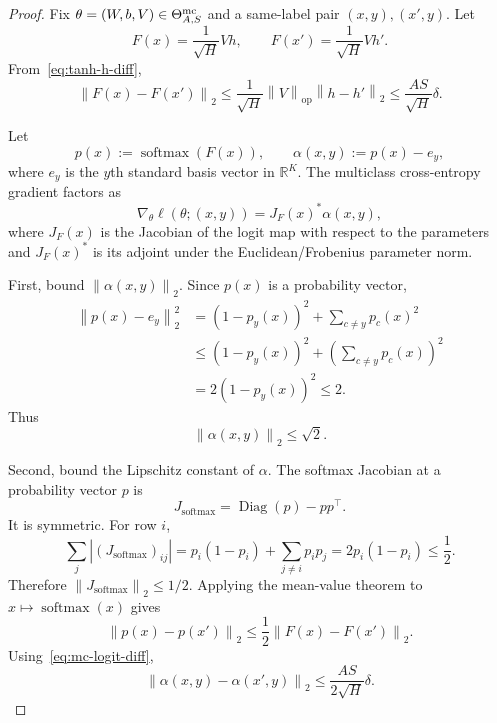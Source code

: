 \documentclass[11pt,a4paper]{report}
\theoremstyle{plain}
\theoremstyle{definition}
\theoremstyle{remark}
\DeclareMathOperator{\softmax}{softmax}
\DeclareMathOperator{\Diag}{Diag}
\newcommand{\R}{\mathbb{R}}
\newcommand{\op}{\mathrm{op}}
\newcommand{\norm}[1]{\left\lVert #1\right\rVert}
\begin{document}
\begin{proof}
Fix $\theta=(W,b,V)\in\Theta_{A,S}^{\rm mc}$ and a same-label pair
$(x,y),(x',y)$.  Let
\[
F(x)=\frac1{\sqrt H}Vh,
\qquad
F(x')=\frac1{\sqrt H}Vh'.
\]
From~\eqref{eq:tanh-h-diff},
\begin{equation}
\label{eq:mc-logit-diff}
\norm{F(x)-F(x')}_2
\le
\frac1{\sqrt H}\norm{V}_{\op}\norm{h-h'}_2
\le
\frac{AS}{\sqrt H}\delta.
\end{equation}

Let
\[
p(x):=\softmax(F(x)),
\qquad
\alpha(x,y):=p(x)-e_y,
\]
where $e_y$ is the $y$th standard basis vector in $\R^K$.  The multiclass
cross-entropy gradient factors as
\begin{equation}
\label{eq:mc-gradient-factorization}
\nabla_\theta\ell(\theta;(x,y))
=
J_F(x)^\ast\alpha(x,y),
\end{equation}
where $J_F(x)$ is the Jacobian of the logit map with respect to the parameters
and $J_F(x)^\ast$ is its adjoint under the Euclidean/Frobenius parameter norm.

First, bound $\norm{\alpha(x,y)}_2$.  Since $p(x)$ is a probability vector,
\begin{align*}
\norm{p(x)-e_y}_2^2
&=(1-p_y(x))^2+
\sum_{c\ne y}p_c(x)^2\\
&\le
(1-p_y(x))^2+
\left(\sum_{c\ne y}p_c(x)\right)^2\\
&=2(1-p_y(x))^2
\le2.
\end{align*}
Thus
\begin{equation}
\label{eq:alpha-norm-bound}
\norm{\alpha(x,y)}_2\le\sqrt2.
\end{equation}

Second, bound the Lipschitz constant of $\alpha$.  The softmax Jacobian at a
probability vector $p$ is
\[
J_{\softmax}=\Diag(p)-pp^\top.
\]
It is symmetric.  For row $i$,
\[
\sum_j |(J_{\softmax})_{ij}|
=p_i(1-p_i)+\sum_{j\ne i}p_ip_j
=2p_i(1-p_i)
\le\frac12.
\]
Therefore $\norm{J_{\softmax}}_2\le1/2$.  Applying the mean-value theorem to
$x\mapsto\softmax(x)$ gives
\[
\norm{p(x)-p(x')}_2
\le
\frac12\norm{F(x)-F(x')}_2.
\]
Using~\eqref{eq:mc-logit-diff},
\begin{equation}
\label{eq:alpha-lipschitz}
\norm{\alpha(x,y)-\alpha(x',y)}_2
\le
\frac{AS}{2\sqrt H}\delta.
\end{equation}


\end{proof}
\end{document}
